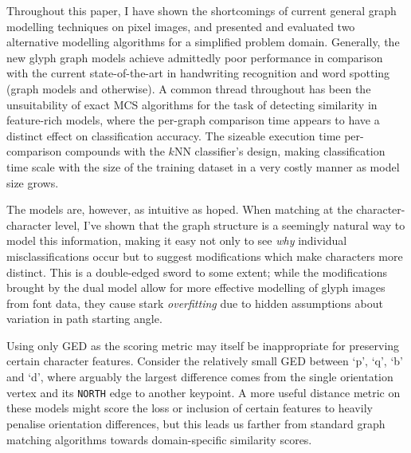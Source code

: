 \documentclass{mpaper}
\begin{document}
Throughout this paper, I have shown the shortcomings of current general graph modelling techniques on pixel images, and presented and evaluated two alternative modelling algorithms for a simplified problem domain.
Generally, the new glyph graph models achieve admittedly poor performance in comparison with the current state-of-the-art in handwriting recognition and word spotting (graph models and otherwise).
A common thread throughout has been the unsuitability of exact MCS algorithms for the task of detecting similarity in feature-rich models, where the per-graph comparison time appears to have a distinct effect on classification accuracy.
The sizeable execution time per-comparison compounds with the $k$NN classifier's design, making classification time scale with the size of the training dataset in a very costly manner as model size grows.

The models are, however, as intuitive as hoped.
When matching at the character-character level, I've shown that the graph structure is a seemingly natural way to model this information, making it easy not only to see \emph{why} individual misclassifications occur but to suggest modifications which make characters more distinct.
This is a double-edged sword to some extent; while the modifications brought by the dual model allow for more effective modelling of glyph images from font data, they cause stark \emph{overfitting} due to hidden assumptions about variation in path starting angle.

Using only GED as the scoring metric may itself be inappropriate for preserving certain character features.
Consider the relatively small GED between `p', `q', `b' and `d', where arguably the largest difference comes from the single orientation vertex and its \texttt{NORTH} edge to another keypoint.
A more useful distance metric on these models might score the loss or inclusion of certain features to heavily penalise orientation differences, but this leads us farther from standard graph matching algorithms towards domain-specific similarity scores.
\end{document}
